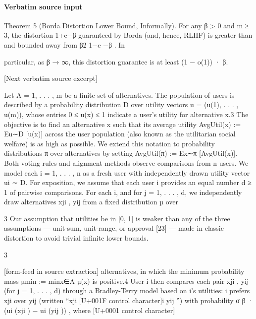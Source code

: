 \documentclass[10pt]{article}
\begin{document}
\paragraph{Verbatim source input}
\begin{ReviewVerbatim}
Theorem 5 (Borda Distortion Lower Bound, Informally). For any β > 0 and m ≥ 3, the distortion
                                                                                          1+e−β
guaranteed by Borda (and, hence, RLHF) is greater than and bounded away from β2 1−e           −β . In

particular, as β → ∞, this distortion guarantee is at least (1 − o(1)) · β.

[Next verbatim source excerpt]

Let A = {1, . . . , m} be a finite set of alternatives. The population of users is described by a
probability distribution D over utility vectors u = (u(1), . . . , u(m)), whose entries 0 ≤ u(x) ≤ 1
indicate a user’s utility for alternative x.3 The objective is to find an alternative x such that its average
utility AvgUtil(x) := Eu∼D [u(x)] across the user population (also known as the utilitarian social
welfare) is as high as possible. We extend this notation to probability distributions π over alternatives
by setting AvgUtil(π) := Ex∼π [AvgUtil(x)].
Both voting rules and alignment methods observe comparisons from n users. We model each
i = 1, . . . , n as a fresh user with independently drawn utility vector ui ∼ D. For exposition, we
assume that each user i provides an equal number d ≥ 1 of pairwise comparisons. For each i,
and for j = 1, . . . , d, we independently draw alternatives xji , yij from a fixed distribution µ over

    3
     Our assumption that utilities be in [0, 1] is weaker than any of the three assumptions — unit-sum, unit-range,
or approval [23] — made in classic distortion to avoid trivial infinite lower bounds.


                                                           3

[form-feed in source extraction]
alternatives, in which the minimum probability mass µmin := minx∈A µ(x) is positive.4 User i
then compares each pair {xji , yij } (for j = 1, . . . , d) through a Bradley-Terry model based on i’s
utilities: i prefers xji over yij (written “xji [U+001F control character]i yij ”) with probability σ β · (ui (xji ) − ui (yij )) , where
                                                                                                        [U+0001 control character]


\end{ReviewVerbatim}
\end{document}
